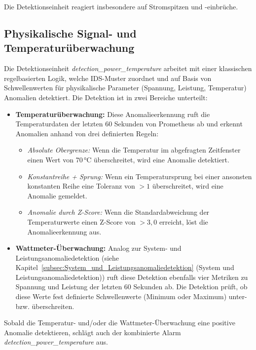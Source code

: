     Die Detektionseinheit reagiert insbesondere auf Stromspitzen und -einbrüche.

    \subsection{Physikalische Signal- und Temperaturüberwachung}
    \label{subsec:physikalische_signale_und_temperaturueberwachung}

    Die Detektionseinheit \textit{detection\_power\_temperature} arbeitet mit einer klassischen regelbasierten Logik, welche IDS-Muster zuordnet und auf Basis von Schwellenwerten für physikalische Parameter (Spannung, Leistung, Temperatur) Anomalien detektiert. Die Detektion ist in zwei Bereiche unterteilt:

    \begin{itemize}
        \item \textbf{Temperaturüberwachung:} Diese Anomalieerkennung ruft die Temperaturdaten der letzten 60 Sekunden von Prometheus ab und erkennt Anomalien anhand von drei definierten Regeln:
        \begin{itemize}
            \item \textit{Absolute Obergrenze:} Wenn die Temperatur im abgefragten Zeitfenster einen Wert von 70\,°C überschreitet, wird eine Anomalie detektiert.
            \item \textit{Konstantreihe + Sprung:} Wenn ein Temperatursprung bei einer ansonsten konstanten Reihe eine Toleranz von $> 1$ überschreitet, wird eine Anomalie gemeldet.
            \item \textit{Anomalie durch Z-Score:} Wenn die Standardabweichung der Temperaturwerte einen Z-Score von $> 3,0$ erreicht, löst die Anomalieerkennung aus.
        \end{itemize}
        \item \textbf{Wattmeter-Überwachung:} Analog zur System- und Leistungsanomaliedetektion (siehe Kapitel~\ref{subsec:System_und_Leistungsanomaliedetektion} (System und Leistungsanomaliedetektion)) ruft diese Detektion ebenfalls vier Metriken zu Spannung und Leistung der letzten 60 Sekunden ab. Die Detektion prüft, ob diese Werte fest definierte Schwellenwerte (Minimum oder Maximum) unter- bzw. überschreiten.
    \end{itemize}

    Sobald die Temperatur- und/oder die Wattmeter-Überwachung eine positive Anomalie detektieren, schlägt auch der kombinierte Alarm \textit{detection\_power\_temperature} aus.

